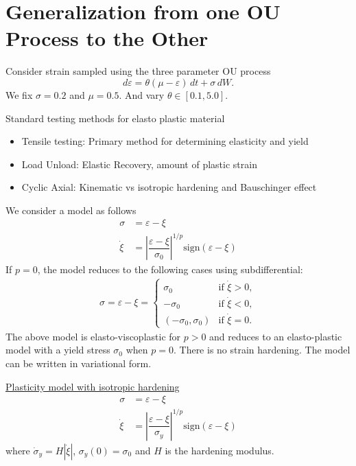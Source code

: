 \documentclass[11pt]{article}
\begin{document}
\section{Generalization from one OU Process to the Other}
Consider strain sampled using the three parameter OU process 
\begin{equation}
    d\varepsilon = \theta(\mu -  \varepsilon) \, dt + \sigma \, dW.
\end{equation}
We fix $\sigma = 0.2$ and $\mu = 0.5$. And vary $\theta \in [0.1, 5.0]$.

Standard testing methods for elasto plastic material 
\begin{itemize}
    \item Tensile testing: Primary method for determining elasticity and yield 
    \item Load Unload: Elastic Recovery, amount of plastic strain 
    \item Cyclic Axial: Kinematic vs isotropic hardening and Bauschinger effect
\end{itemize}
We consider a model as follows 
\begin{align}
    \sigma &= \varepsilon - \xi \\
    \dot{\xi} &= \left|\dfrac{\varepsilon - \xi}{\sigma_0}\right|^{1/p}\mathrm{sign}(\varepsilon - \xi)
\end{align}
If $p=0$, the model reduces to the following cases using subdifferential:
\begin{align}
   \sigma = \varepsilon - \xi =  \begin{cases}
    \sigma_0 & \text{if } \dot{\xi} > 0, \\
    -\sigma_0 & \text{if } \dot{\xi} < 0, \\
    (-\sigma_0, \sigma_0) & \text{if } \dot{\xi} = 0.
   \end{cases}
\end{align}
The above model is elasto-viscoplastic for $p>0$ and reduces to an elasto-plastic model with a yield stress $\sigma_0$ when $p=0$. There is no strain hardening. The model can be written in variational form.

\underline{Plasticity model with isotropic hardening}
\begin{align}
    \sigma &= \varepsilon - \xi \\
    \dot{\xi} &= \left|\dfrac{\varepsilon - \xi}{\sigma_y}\right|^{1/p}\mathrm{sign}(\varepsilon - \xi)
\end{align}
where $\dot{\sigma}_y = H |\dot{\xi}|$, $\sigma_y(0) = \sigma_0$ and $H$ is the hardening modulus.
\end{document}
